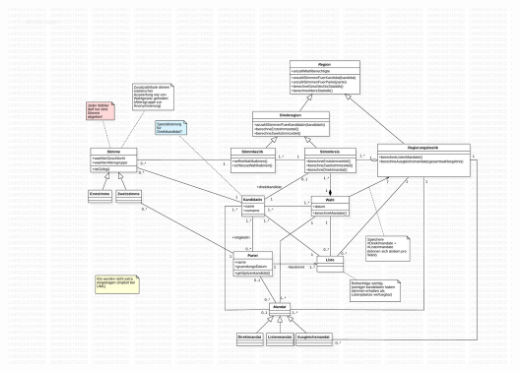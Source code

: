 \documentclass[a4paper,12pt]{article}
\begin{document}
\begin{center}
	\includegraphics[width=\textwidth]{../model.pdf}
\end{center}
\end{document}
